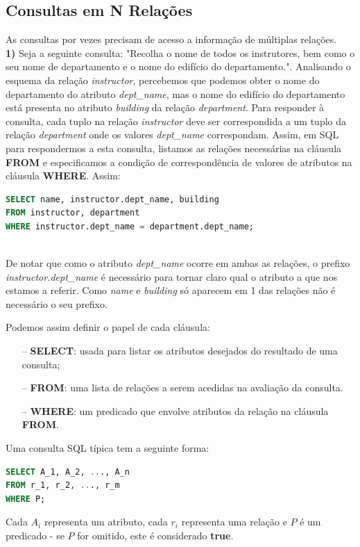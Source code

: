 \documentclass[oneside]{book}
\theoremstyle{definition}
\begin{document}
\subsection{Consultas em N Relações}
As consultas por vezes precisam de acesso a informação de múltiplas relações. \\
\textbf{1)} Seja a seguinte consulta: "Recolha o nome de todos os instrutores, bem como o seu nome de departamento e o nome do edifício do departamento.". Analisando o esquema da relação \textit{instructor}, percebemos que podemos obter o nome do departamento do atributo \textit{dept\_name}, mas o nome do edifício do departamento está presenta no atributo \textit{building} da relação \textit{department}. Para responder à consulta, cada tuplo na relação \textit{instructor} deve ser correspondida a um tuplo da relação \textit{department} onde os valores \textit{dept\_name} correspondam. Assim, em SQL para respondermos a esta consulta, listamos as relações necessárias na cláusula \textbf{FROM} e especificamos a condição de correspondência de valores de atributos na cláusula \textbf{WHERE}. Assim:

\begin{lstlisting}[language=SQL, morekeywords={REFERENCES, REFRESH, MATERIALIZED, CONCURRENTLY}, framesep=8pt, xleftmargin=40pt, framexleftmargin=40pt, frame=tb, framerule=0pt]
SELECT name, instructor.dept_name, building
FROM instructor, department
WHERE instructor.dept_name = department.dept_name;
\end{lstlisting} \\
De notar que como o atributo \textit{dept\_name} ocorre em ambas as relações, o prefixo \textit{instructor.dept\_name} é necessário para tornar claro qual o atributo a que nos estamos a referir. Como \textit{name} e \textit{building} só aparecem em 1 das relações não é necessário o seu prefixo.

Podemos assim definir o papel de cada cláusula:
\begin{itemize}
    \itemsep0cm
    \item[--]\textbf{SELECT}: usada para listar os atributos desejados do resultado de uma consulta;
    \item[--]\textbf{FROM}: uma lista de relações a serem acedidas na avaliação da consulta.
    \item[--]\textbf{WHERE}: um predicado que envolve atributos da relação na cláusula \textbf{FROM}.
\end{itemize}

Uma consulta SQL típica tem a seguinte forma:
\begin{lstlisting}[language=SQL, morekeywords={REFERENCES, REFRESH, MATERIALIZED, CONCURRENTLY}, framesep=8pt, xleftmargin=40pt, framexleftmargin=40pt, frame=tb, framerule=0pt]
SELECT A_1, A_2, ..., A_n
FROM r_1, r_2, ..., r_m
WHERE P;
\end{lstlisting}
Cada $A_i$ representa um atributo, cada $r_i$ representa uma relação e $P$ é um predicado - se $P$ for omitido, este é considerado \textbf{true}.
\end{document}
